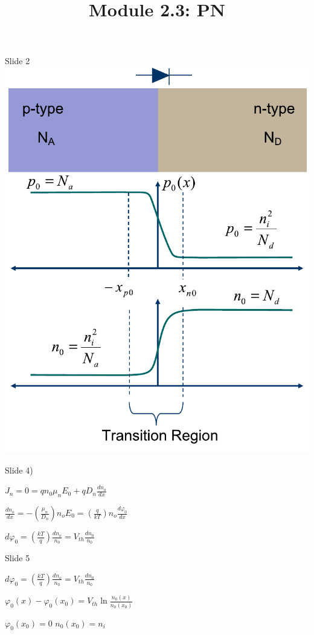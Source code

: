 \documentclass{beamer}
\title{Module 2.3: PN}
\begin{document}
\begin{frame}{Slide 2}
\includegraphics[width=.6\columnwidth]{slide2}
\end{frame}


\begin{frame}{Slide 4)}


${J_n} = 0 = q{n_0}{\mu _n}{E_0} + q{D_n}\frac{{d{n_o}}}{{dx}}$

$\frac{{d{n_o}}}{{dx}} =  - \left( {\frac{{{\mu _n}}}{{{D_n}}}} \right){n_o}{E_0} = \left( {\frac{q}{{kT}}} \right){n_o}\frac{{d{\varphi _0}}}{{dx}}$

$d{\varphi _0} = \left( {\frac{{kT}}{q}} \right)\frac{{d{n_o}}}{{{n_0}}} = {V_{th}}\frac{{d{n_0}}}{{{n_0}}}$

\end{frame}

\begin{frame}{Slide 5}

 $d{\varphi _0} = \left( {\frac{{kT}}{q}} \right)\frac{{d{n_o}}}{{{n_0}}} = {V_{th}}\frac{{d{n_0}}}{{{n_0}}}$

 ${\varphi _0}(x) - {\varphi _0}({x_0}) = {V_{th}}\ln \frac{{{n_0}(x)}}{{{n_0}({x_0})}}$

 ${\varphi _0}({x_0}) = 0$ $ {n_0}({x_0}) = {n_i}$

\end{frame}
\end{document}
